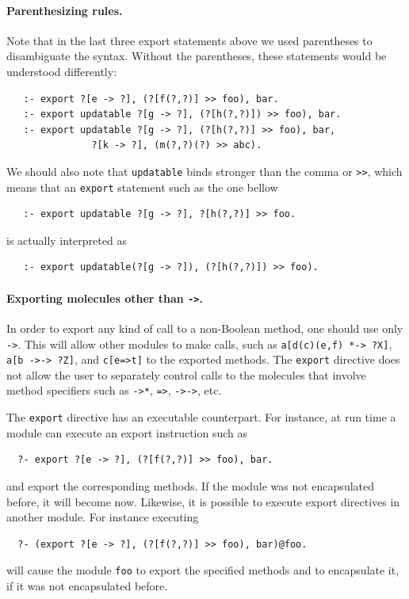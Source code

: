 \documentclass[11pt]{article}
\begin{document}
\paragraph{Parenthesizing rules.}
Note that in the last three export statements above we used parentheses to
disambiguate the syntax. Without the parentheses, these statements would be
understood differently:
\begin{verbatim}
   :- export ?[e -> ?], (?[f(?,?)] >> foo), bar.
   :- export updatable ?[g -> ?], (?[h(?,?)]) >> foo), bar.
   :- export updatable ?[g -> ?], (?[h(?,?)] >> foo), bar,
               ?[k -> ?], (m(?,?)(?) >> abc).  
\end{verbatim}
We should also note that {\tt updatable} binds stronger than the comma or
{\tt >>}, which means that an {\tt export} statement such as the one bellow
\begin{verbatim}
   :- export updatable ?[g -> ?], ?[h(?,?)] >> foo.
\end{verbatim}
is actually interpreted as
\begin{verbatim}
   :- export updatable(?[g -> ?]), (?[h(?,?)]) >> foo).
\end{verbatim}

\paragraph{Exporting molecules other than {\tt ->}.}  
In order to export any kind of call to a non-Boolean
method, one should use only {\tt ->}. This will
allow other modules to make calls, such as {\tt a[d(c)(e,f) *-> ?X]}, {\tt
  a[b ->-> ?Z]}, and {\tt c[e=>t]}  to the exported methods.  The {\tt export}
directive does not allow the user to separately control calls to the
molecules that involve method specifiers such as {\tt ->*}, {\tt =>},
{\tt ->->}, etc.

The {\tt export} directive has an executable counterpart. For instance, at
run time a module can execute an export instruction such as 
\begin{verbatim}
  ?- export ?[e -> ?], (?[f(?,?)] >> foo), bar.  
\end{verbatim}
and export the corresponding methods. If the module was not encapsulated
before, it will become now. Likewise, it is possible to execute export
directives in another module. For instance executing
\begin{verbatim}
  ?- (export ?[e -> ?], (?[f(?,?)] >> foo), bar)@foo.
\end{verbatim}
will cause the module {\tt foo} to export the specified methods and to
encapsulate it, if it was not encapsulated before. 
\end{document}
